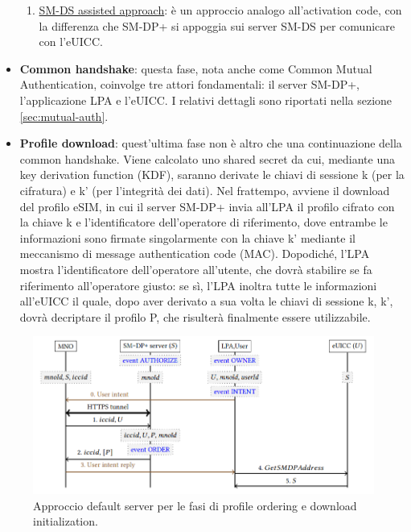 \documentclass[10pt, twoside, openany]{book}
\begin{document}
\begin{itemize}
\begin{enumerate}
\item \underline{SM-DS assisted approach}: è un approccio analogo all'activation code, con la differenza che SM-DP+ si appoggia sui server SM-DS per comunicare con l'eUICC.
\end{enumerate}
\item \textbf{Common handshake}: questa fase, nota anche come Common Mutual Authentication, coinvolge tre attori fondamentali: il server SM-DP+, l'applicazione LPA e l'eUICC. I relativi dettagli sono riportati nella sezione \ref{sec:mutual-auth}.
\item \textbf{Profile download}: quest'ultima fase non è altro che una continuazione della common handshake. Viene calcolato uno shared secret da cui, mediante una key derivation function (KDF), saranno derivate le chiavi di sessione k (per la cifratura) e k' (per l'integrità dei dati). Nel frattempo, avviene il download del profilo eSIM, in cui il server SM-DP+ invia all'LPA il profilo cifrato con la chiave k e l'identificatore dell'operatore di riferimento, dove entrambe le informazioni sono firmate singolarmente con la chiave k' mediante il meccanismo di message authentication code (MAC). Dopodiché, l'LPA mostra l'identificatore dell'operatore all'utente, che dovrà stabilire se fa riferimento all'operatore giusto: se sì, l'LPA inoltra tutte le informazioni all'eUICC il quale, dopo aver derivato a sua volta le chiavi di sessione k, k', dovrà decriptare il profilo P, che risulterà finalmente essere utilizzabile.
\end{itemize}
\begin{figure}
\includegraphics[width=\linewidth]{default-server.png}
\caption{Approccio default server per le fasi di profile ordering e download initialization.}
\label{fig:default-server}
\end{figure}
\end{document}
